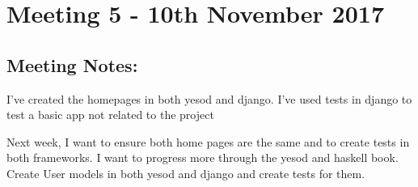 \section{Meeting 5 - 10th November 2017}

\subsection{Meeting Notes:}

I’ve created the homepages in both yesod and django. I’ve used tests in django to test a basic app not related to the project

Next week, I want to ensure both home pages are the same and to create tests in both frameworks. I want to progress more through the yesod and haskell book.
Create User models in both yesod and django and create tests for them.
